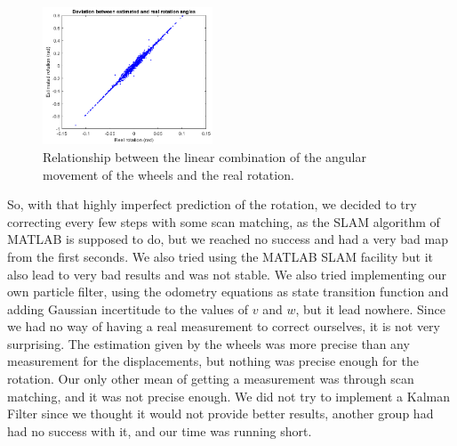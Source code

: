 \documentclass[a4paper, 10pt, conference]{ieeeconf}
\begin{document}
    \begin{figure}[!h]
        \centering
        \includegraphics[width=0.45\textwidth]{resources/png/deviation-angle.png}
        \caption{Relationship between the linear combination of the angular movement of the wheels and the real rotation.}
        \label{fig:slam.relationship.rotation}
    \end{figure}
    
    So, with that highly imperfect prediction of the rotation, we decided to try correcting every few steps with some scan matching, as the SLAM algorithm of MATLAB is supposed to do, but we reached no success and had a very bad map from the first seconds. We also tried using the MATLAB SLAM facility but it also lead to very bad results and was not stable. We also tried implementing our own particle filter, using the odometry equations as state transition function and adding Gaussian incertitude to the values of $v$ and $w$, but it lead nowhere. Since we had no way of having a real measurement to correct ourselves, it is not very surprising. The estimation given by the wheels was more precise than any measurement for the displacements, but nothing was precise enough for the rotation. Our only other mean of getting a measurement was through scan matching, and it was not precise enough. We did not try to implement a Kalman Filter since we thought it would not provide better results, another group had had no success with it, and our time was running short.
    
\end{document}
